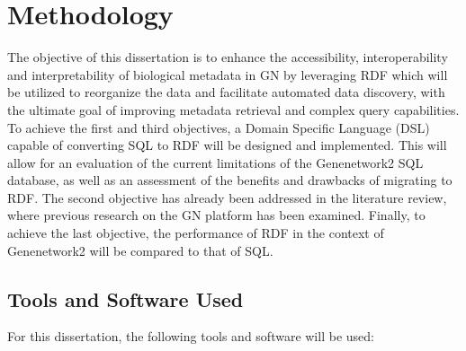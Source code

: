 \chapter{Methodology}

The objective of this dissertation is to enhance the accessibility, interoperability and interpretability of biological metadata in GN by leveraging RDF which will be utilized to reorganize the data and facilitate automated data discovery, with the ultimate goal of improving metadata retrieval and complex query capabilities.  To achieve the first and third objectives, a Domain Specific Language (DSL) capable of converting SQL to RDF will be designed and implemented.  This will allow for an evaluation of the current limitations of the Genenetwork2 SQL database, as well as an assessment of the benefits and drawbacks of migrating to RDF.  The second objective has already been addressed in the literature review, where previous research on the GN platform has been examined.  Finally, to achieve the last objective, the performance of RDF in the context of Genenetwork2 will be compared to that of SQL.

\section{Tools and Software Used}

For this dissertation, the following tools and software will be used:

